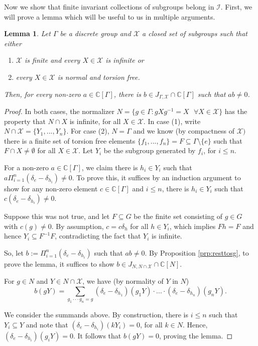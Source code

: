 \documentclass[a4paper, 12pt]{amsart}
\newtheorem{lem}[thm]{Lemma}
\theoremstyle{definition}
\theoremstyle{remark}
\numberwithin{equation}{section}
\begin{document}
Now we show that finite invariant collections of subgroups belong in $\mathcal{I}$. First, we will prove a lemma which will be useful to us in multiple arguments.

\begin{lem}
\label{lem:prodelementconstr}
    Let $\Gamma$ be a discrete group and $\mathcal{X}$ a closed set of subgroups such that either

    \begin{enumerate}
        \item $\mathcal{X}$ is finite and every $X\in\mathcal{X}$ is infinite or
        \item every $X\in\mathcal{X}$ is normal and torsion free.
    \end{enumerate}
    Then, for every non-zero $a\in\mathbb{C}[\Gamma]$, there is $b\in J_{\Gamma,\mathcal{X}}\cap\mathbb{C}[\Gamma]$ such that $ab\neq 0$.
\end{lem}
\begin{proof}
    In both cases, the normalizer $N = \{g\in\Gamma: gXg^{-1} = X\text{ }\forall X\in\mathcal{X}\}$ has the property that $N\cap X$ is infinite, for all $X\in\mathcal{X}$. In case (1), write $N\cap\mathcal{X} = \{Y_{1},...,Y_{n}\}$. For case (2), $N = \Gamma$ and we know (by compactness of $\mathcal{X})$ there is a finite set of torsion free elements $\{f_{1},...,f_{n}\} = F\subseteq \Gamma\setminus\{e\}$ such that $F\cap X\neq \emptyset$ for all $X\in\mathcal{X}$. Let $Y_{i}$ be the subgroup generated by $f_{i}$, for $i\leq n$.

    For a non-zero $a\in\mathbb{C}[\Gamma]$, we claim there is $h_{i}\in Y_{i}$ such that $a\Pi^{n}_{i=1}(\delta_{e} - \delta_{h_{i}})\neq 0$. To prove this, it suffices by an induction argument to show for any non-zero element $c\in\mathbb{C}[\Gamma]$ and $i\leq n$, there is $h_{i}\in Y_{i}$ such that $c(\delta_{e} - \delta_{h_{i}})\neq 0$.

    Suppose this was not true, and let $F\subseteq G$ be the finite set consisting of $g\in G$ with $c(g)\neq 0$. By assumption, $c = c\delta_{h}$ for all $h\in Y_{i}$, which implies $Fh = F$ and hence $Y_{i}\subseteq F^{-1}F$, contradicting the fact that $Y_{i}$ is infinite. 

    So, let $b := \Pi^{n}_{i=1}(\delta_{e} - \delta_{h_{i}})$ such that $ab\neq 0$. By Proposition \ref{prp:resttosg}, to prove the lemma, it suffices to show $b\in J_{N, N\cap\mathcal{X}}\cap \mathbb{C}[N]$.

    For $g\in N$ and $Y\in N\cap\mathcal{X}$, we have (by normality of $Y$ in $N$)
     $$b(gY) = \sum_{g_{1}\cdot\cdot\cdot g_{n} = g}(\delta_{e}-\delta_{h_{1}})(g_{1}Y)\cdot...\cdot (\delta_{e}-\delta_{h_{n}})(g_{n}Y).$$

    We consider the summands above. By construction, there is $i\leq n$ such that $Y_{i}\subseteq Y$ and note that $(\delta_{e} - \delta_{h_{i}})(kY_{i}) = 0$, for all $k\in N$. Hence, $(\delta_{e} - \delta_{h_{i}})(g_{i}Y) = 0$.  It follows that $b(gY) = 0$, proving the lemma. 
\end{proof}
\end{document}
